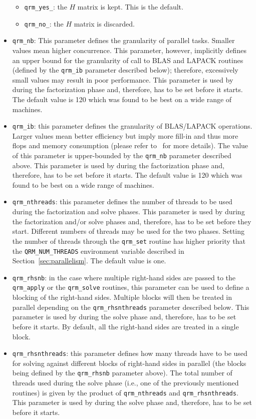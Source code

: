 \documentclass[11pt]{article}
\begin{document}
\begin{itemize}
\begin{itemize}
  \item \texttt{qrm\_yes\_}: the $H$ matrix is kept. This is the default.
  \item \texttt{qrm\_no\_}: the $H$ matrix is discarded.
  \end{itemize}
\item \texttt{qrm\_nb}: This parameter defines the granularity of
  parallel tasks. Smaller values mean higher concurrence. This
  parameter, however, implicitly defines an upper bound for the
  granularity of call to BLAS and LAPACK routines (defined by the
  \texttt{qrm\_ib} parameter described below); therefore, excessively
  small values may result in poor performance. This parameter is used
  by \qrm during the factorization phase and, therefore, has to be set
  before it starts. The default value is 120 which was found to be
  best on a wide range of machines.
\item \texttt{qrm\_ib}: this parameter defines the granularity of
  BLAS/LAPACK operations. Larger values mean better efficiency but
  imply more fill-in and thus more flops and memory consumption
  (please refer to~\cite{butt:11} for more details). The value of this
  parameter is upper-bounded by the \texttt{qrm\_nb} parameter
  described above. This parameter is used by \qrm during the
  factorization phase and, therefore, has to be set before it
  starts. The default value is 120 which was found to be best on a
  wide range of machines.
\item \texttt{qrm\_nthreads}: this parameter defines the number of
  threads to be used during the factorization and solve phases.  This
  parameter is used by \qrm during the factorization and/or solve
  phases and, therefore, has to be set before they start. Different
  numbers of threads may be used for the two phases. Setting the
  number of threads through the \texttt{qrm\_set} routine has higher
  priority that the \texttt{QRM\_NUM\_THREADS} environment variable
  described in Section~\ref{sec:parallelism}. The default value is one.
\item \texttt{qrm\_rhsnb}: in the case where multiple right-hand sides
  are passed to the \texttt{qrm\_apply} or the \texttt{qrm\_solve}
  routines, this parameter can be used to define a blocking of the
  right-hand sides. Multiple blocks will then be treated in parallel
  depending on the \texttt{qrm\_rhsnthreads} parameter described
  below. This parameter is used by \qrm during the solve phase and,
  therefore, has to be set before it starts. By default, all the
  right-hand sides are treated in a single block.
\item \texttt{qrm\_rhsnthreads}: this parameter defines how many
  threads have to be used for solving against different blocks of
  right-hand sides in parallel (the blocks being defined by the
  \texttt{qrm\_rhsnb} parameter above). The total number of threads
  used during the solve phase (i.e., one of the previously mentioned
  routines) is given by the product of \texttt{qrm\_nthreads} and
  \texttt{qrm\_rhsnthreads}. This parameter is used by \qrm
  during the solve phase and, therefore, has to be set before it
  starts. 
\end{itemize}
\end{document}
